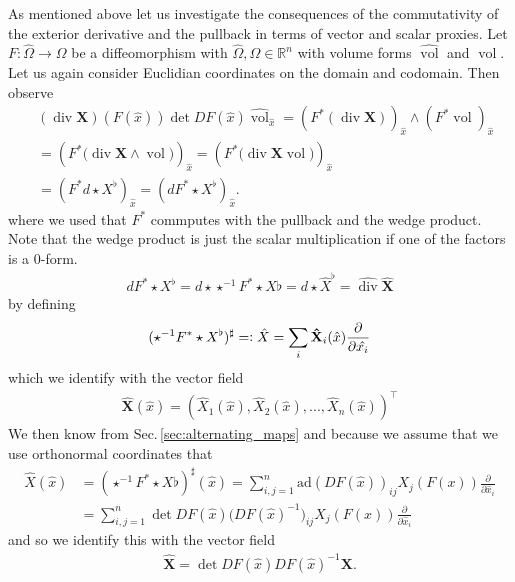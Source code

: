 \documentclass[12pt,a4paper]{article}
\numberwithin{equation}{subsection}
\numberwithin{lemma}{subsection}
\theoremstyle{definition}
\DeclareMathOperator{\diver}{div}
\DeclareMathOperator{\vol}{vol}
\newcommand{\real}{\mathbb{R}}
\begin{document}
As mentioned above let us investigate the consequences of the 
commutativity of the exterior derivative and the pullback in terms 
of vector and scalar proxies.
Let $F: \widehat{\Omega} \rightarrow \Omega$ be a diffeomorphism with 
$\widehat{\Omega}, \Omega \in \real^n$ with volume forms $\widehat{\vol}$ and 
$\vol$. Let us again consider Euclidian 
coordinates on the domain and codomain. Then observe
\begin{align*}
    & (\diver \mathbf{X})(F(\hat{x}))  \det DF(\hat{x}) \widehat{\vol}_{\hat{x}} 
    = ( F^* (\diver \mathbf{X}))_{\hat{x}} \wedge (F^* \vol)_{\hat{x}}
    \\ &= \left( F^* \big( \diver \mathbf{X} \wedge \vol \big) \right)_{\hat{x}}
    =  \left( F^* \big( \diver \mathbf{X} \vol \big) \right)_{\hat{x}}
    \\ &= \left( F^* d \star X^\flat  \right)_{\hat{x}}
    = \left( d F^* \star X^\flat  \right)_{\hat{x}}.
\end{align*}
where we used that $F^*$ commputes with the pullback and the 
wedge product. Note that the wedge product is just the scalar multiplication 
if one of the factors is a $0$-form.
\begin{align*}
    d F^* \star X^\flat = d \star \star^{-1} F^* \star X\flat 
    = d \star \hat{X}^\flat = \widehat{\diver} \mathbf{\widehat{X}}
\end{align*}
by defining 
\begin{align*}
    ( \star^{-1} F^* \star X^\flat)^\sharp 
    =\vcentcolon \hat{X} = \sum_i \mathbf{\hat{X}}_i(\hat{x})  
     \frac{\partial}{\partial \hat{x_i}}
\end{align*}
which we identify with the vector field
\begin{align*}
    \mathbf{\widehat{X}}(\hat{x}) 
    = (\widehat{X}_1(\hat{x}), \widehat{X}_2(\hat{x})
        , ..., \widehat{X}_n(\hat{x}) )^\top
\end{align*}
We then know from Sec.\,\ref{sec:alternating_maps} and because we assume
that we use orthonormal coordinates that 
\begin{align*}
    \hat{X}(\hat{x}) 
    &= ( \star^{-1} F^* \star X\flat)^\sharp (\hat{x})
    = \sum_{i,j=1}^n \text{ad}(DF(\hat{x}))_{ij} X_j(F(x)) 
        \frac{\partial}{\partial \hat{x}_i}
    \\ &= \sum_{i,j=1}^n \det DF(\hat{x}) \big( DF(\hat{x})^{-1}\big)_{ij} X_j(F(x)) 
        \frac{\partial}{\partial \hat{x}_i}
\end{align*}
and so we identify this with the vector field
\begin{align*}
    \mathbf{\widehat{X}} = \det DF(\hat{x}) DF(\hat {x})^{-1} \mathbf{X}.
\end{align*}
\end{document}
